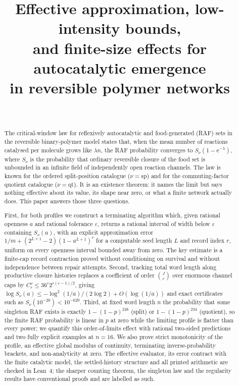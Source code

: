 \documentclass[11pt,a4paper]{article}
\title{Effective approximation, low-intensity bounds,\\ and finite-size effects for autocatalytic emergence\\ in reversible polymer networks}
\author{\PaperAuthor\\ \PaperAffiliation}
\date{\PaperDate}
\theoremstyle{plain}
\theoremstyle{definition}
\theoremstyle{remark}
\newcommand{\qt}{\mathrm{qt}}
\newcommand{\spc}{\mathrm{sp}}
\newcommand{\eps}{\varepsilon}
\newcommand{\ee}{\mathrm{e}}
\begin{document}
\maketitle

\begin{abstract}
The critical-window law for reflexively autocatalytic and food-generated (RAF) sets in the reversible binary-polymer model states that, when the mean number of reactions catalysed per molecule grows like $\lambda n$, the RAF probability converges to $S_\nu(1-\ee^{-\lambda})$, where $S_\nu$ is the probability that ordinary reversible closure of the food set is unbounded in an infinite field of independently open reaction channels. The law is known for the ordered split-position catalogue ($\nu=\spc$) and for the commuting-factor quotient catalogue ($\nu=\qt$). It is an existence theorem: it names the limit but says nothing effective about its value, its shape near zero, or what a finite network actually does. This paper answers those three questions.

First, for both profiles we construct a terminating algorithm which, given rational openness $a$ and rational tolerance $\eps$, returns a rational interval of width below $\eps$ containing $S_\nu(a)$, with an explicit approximation error $1/m+(2^{L+1}-2)(1-a^{L+1})^r$ for a computable seed length $L$ and record index $r$, uniform on every openness interval bounded away from zero. The key estimate is a finite-cap record contraction proved without conditioning on survival and without independence between repair attempts. Second, tracking total word length along productive closure histories replaces a coefficient of order $\binom{J}{r}$ over enormous channel caps by $C_r^\nu\le36^r2^{r(r-1)/2}$, giving $\log S_\nu(a)\le-\log^2(1/a)/(2\log2)+O(\log(1/a))$ and exact certificates such as $S_\nu(10^{-20})<10^{-629}$. Third, at fixed word length $n$ the probability that some singleton RAF exists is exactly $1-(1-p)^{248}$ (split) or $1-(1-p)^{234}$ (quotient), so the finite RAF probability is linear in $p$ at zero while the limiting profile is flatter than every power; we quantify this order-of-limits effect with rational two-sided predictions and two fully explicit examples at $n=16$. We also prove strict monotonicity of the profile, an effective global modulus of continuity, terminating inverse-probability brackets, and non-analyticity at zero. The effective evaluator, its error contract with the finite catalytic model, the settled-history structure and all printed arithmetic are checked in Lean~4; the sharper counting theorem, the singleton law and the regularity results have conventional proofs and are labelled as such.
\end{abstract}
\end{document}
